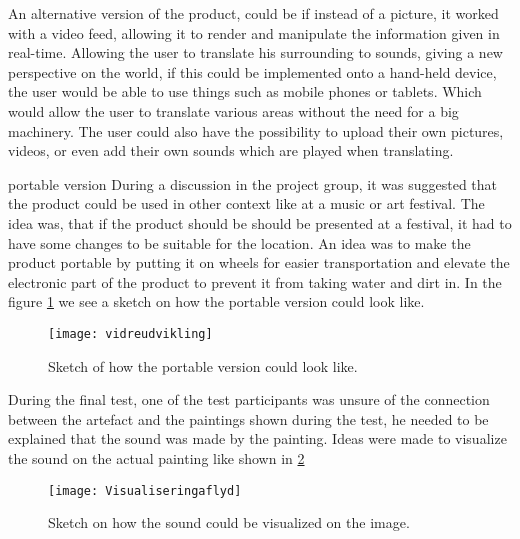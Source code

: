 An alternative version of the product, could be if instead of a picture, it worked with a video feed, allowing it to render and manipulate the information given in real-time. Allowing the user to translate his surrounding to sounds, giving a new perspective on the world, if this could be implemented onto a hand-held device, the user would be able to use things such as mobile phones or tablets. Which would allow the user to translate various areas without the need for a big machinery. 
The user could also have the possibility to upload their own pictures, videos, or even add their own sounds which are played when translating. 

portable version
During a discussion in the project group, it was suggested that the product could be used in other context like at a music or art festival. The idea was, that if the product should be should be presented at a festival, it had to have some changes to be suitable for the location. An idea was to make the product portable by putting it on wheels for easier transportation and elevate the electronic part of the product to prevent it from taking water and dirt in. In the figure \ref{fig:vidreudvikling} we see a sketch on how the portable version could look like. 

\begin{figure}[!h] 
\centering
\texttt{[image: vidreudvikling]}
\caption{\label{fig:vidreudvikling} Sketch of how the portable version could look like.}
\end{figure}




During the final test, one of the test participants was unsure of the connection between the artefact and the paintings shown during the test, he needed to be explained that the sound was made by the painting. Ideas were made to visualize the sound on the actual painting like shown in \ref{fig:Visualiseringaflyd} 

\begin{figure}[!h] 
\centering
\texttt{[image: Visualiseringaflyd]}
\caption{\label{fig:Visualiseringaflyd} Sketch on how the sound could be visualized on the image.}
\end{figure}
 
 
